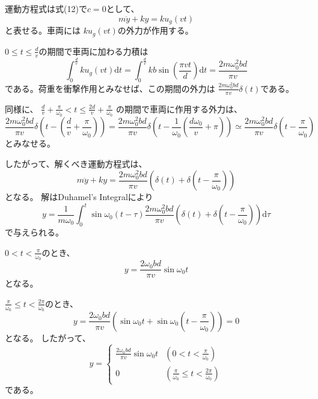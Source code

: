 \documentclass[a4paper]{jsarticle}
\begin{document}
\subsection{}
運動方程式は式(12)で$c = 0$として、
\begin{equation}
  m \ddot{y} + k y = k u_g(vt)
\end{equation}
と表せる。車両には
$k u_g (vt)$の外力が作用する。\par
$0 \leq t \leq \frac{d}{v}$の期間で車両に加わる力積は
\begin{equation}
  \int_0^{\frac{d}{v}} k u_g (vt) \mathrm{d} t
  = \int_0^{\frac{d}{v}} k b \sin \left(\frac{\pi v t}{d}\right) \mathrm{d} t
  = \frac{2 m \omega_0^2 b d}{\pi v}
\end{equation}
である。荷重を衝撃作用とみなせば、この期間の外力は
$\frac{2 m \omega_0^2 b d}{\pi v} \delta(t)$である。\par
同様に、
$\frac{d}{v} + \frac{\pi}{\omega_0} < t \leq \frac{2d}{v} + \frac{\pi}{\omega_0}$
の期間で車両に作用する外力は、
\begin{equation}
  \frac{2 m \omega_0^2 b d}{\pi v} \delta \left(t - \left(\frac{d}{v} + \frac{\pi}{\omega_0}\right)\right)
  = \frac{2 m \omega_0^2 b d}{\pi v} \delta \left(t - \frac{1}{\omega_0}\left(\frac{d \omega_0}{v} + \pi\right)\right)
  \simeq \frac{2 m \omega_0^2 b d}{\pi v} \delta \left(t - \frac{\pi}{\omega_0}\right)
\end{equation}
とみなせる。\par
したがって、解くべき運動方程式は、
\begin{equation}
  m \ddot{y} + k y =
  \frac{2 m \omega_0^2 b d}{\pi v} \left(\delta(t) +
  \delta \left(t - \frac{\pi}{\omega_0}\right)\right)
\end{equation}
となる。
解はDuhamel's Integralにより
\begin{equation}
  y = \frac{1}{m \omega_0}
  \int_0^t \sin \omega_0 (t - \tau) 
  \frac{2 m \omega_0^2 b d}{\pi v} \left(\delta(t) +
  \delta \left(t - \frac{\pi}{\omega_0}\right)\right) \mathrm{d} \tau
\end{equation}
で与えられる。\par
$0 < t < \frac{\pi}{\omega_0}$のとき、
\begin{equation}
  y = \frac{2 \omega_0 b d}{\pi v} \sin \omega_0 t
\end{equation}
となる。\par
$\frac{\pi}{\omega_0} \leq t < \frac{2\pi}{\omega_0}$のとき、
\begin{equation}
  y = \frac{2 \omega_0 b d}{\pi v}
  \left(\sin \omega_0 t + \sin \omega_0 \left(t - \frac{\pi}{\omega_0}\right)\right) =0
\end{equation}
となる。
したがって、
\begin{equation}
  y =
  \begin{cases}
    \frac{2 \omega_0 b d}{\pi v} \sin \omega_0 t & \left(0 < t < \frac{\pi}{\omega_0}\right)\\
    0 & \left(\frac{\pi}{\omega_0} \leq t < \frac{2\pi}{\omega_0}\right)
  \end{cases}
\end{equation}
である。
\end{document}
